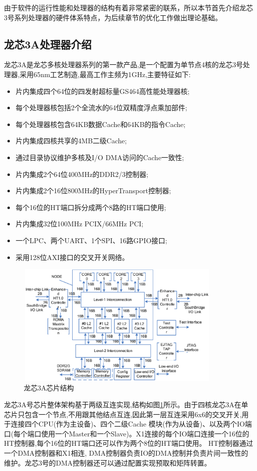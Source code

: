 

由于软件的运行性能和处理器的结构有着非常紧密的联系，所以本节首先介绍龙芯3号系列处理器的硬件体系特点，为后续章节的优化工作做出理论基础。

\subsection{龙芯3A处理器介绍}
龙芯3A是龙芯多核处理器系列的第一款产品,是一个配置为单节点4核的龙芯3号处理器,采用65nm工艺制造,最高工作主频为1GHz,主要特征如下:

\begin{itemize}
\item{}片内集成四个64位的四发射超标量GS464高性能处理器核;
\item{}每个处理器核包括2个全流水的64位双精度浮点乘加部件;
\item{}每个处理器核包含64KB数据Cache和64KB的指令Cache;
\item{}片内集成四核共享的4MB二级Cache;
\item{}通过目录协议维护多核及I/O DMA访问的Cache一致性;
\item{}片内集成2个64位400MHz的DDR2/3控制器;
\item{}片内集成2个16位800MHz的HyperTransport控制器;
\item{}每个16位的HT端口拆分成两个8路的HT端口使用;
\item{}片内集成32位100MHz PCIX/66MHz PCI;
\item{}一个LPC、两个UART、1个SPI、16路GPIO接口;
\item{}采用128位AXI接口的交叉开关网络。
\end{itemize}

\begin{figure}[H] 
  \centering
  \includegraphics[width=10cm,height=6cm]{figures/chap02/Loongson3A}
  \caption{龙芯3A芯片结构}
  \label{fig:loongson3a}
\end{figure}

龙芯3A号芯片整体架构基于两级互连实现,结构如图\ref{fig:loongson3a}所示。由于四核龙芯3A在单芯片只包含一个节点,不用跟其他结点互连,因此第一层互连采用6x6的交叉开关,用于连接四个CPU(作为主设备)、四个二级Cache 模块(作为从设备)、以及两个IO端口(每个端口使用一个Master和一个Slave)。X1连接的每个IO端口连接一个16位的HT控制器,每个16位的HT端口还可以作为两个8位的HT端口使用。 HT控制器通过一个DMA控制器和X1相连, DMA控制器负责IO的DMA控制并负责片间一致性的维护。龙芯3号的DMA控制器还可以通过配置实现预取和矩阵转置\cite{Loongson3A-Manual}。


